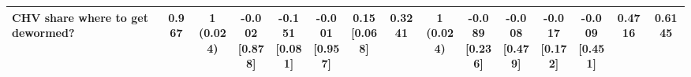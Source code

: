 {\begin{tabular}[t]{lcccccccccccccc}
\hspace{1em}CHV share where to get dewormed? & 0.967 & \makecell[c]{1\\(0.024)} & \makecell[c]{-0.002\\{[0.878]}} & \makecell[c]{-0.151\\{[0.081]}} & \makecell[c]{-0.001\\{[0.957]}} & \makecell[c]{0.15\\{[0.068]}} & 0.3241 & \makecell[c]{1\\(0.024)} & \makecell[c]{-0.089\\{[0.236]}} & \makecell[c]{-0.008\\{[0.479]}} & \makecell[c]{-0.017\\{[0.172]}} & \makecell[c]{-0.009\\{[0.451]}} & 0.4716 & 0.6145\\
\bottomrule
\end{tabular}}

